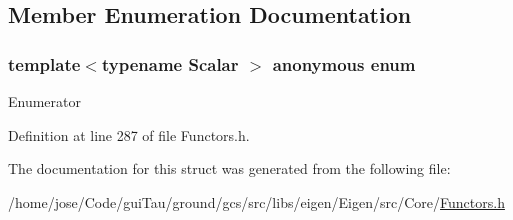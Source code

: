 \subsection{Member Enumeration Documentation}
\hypertarget{structei__functor__traits_3_01ei__scalar__multiple__op_3_01_scalar_01_4_01_4_ada8e544e1769bc2dd640a7e5cf19c49a}{\subsubsection[{anonymous enum}]{\setlength{\rightskip}{0pt plus 5cm}template$<$typename Scalar $>$ anonymous enum}}\label{structei__functor__traits_3_01ei__scalar__multiple__op_3_01_scalar_01_4_01_4_ada8e544e1769bc2dd640a7e5cf19c49a}
\begin{Desc}
\item[Enumerator]\par
\begin{description}
\item[{\em 
\hypertarget{structei__functor__traits_3_01ei__scalar__multiple__op_3_01_scalar_01_4_01_4_ada8e544e1769bc2dd640a7e5cf19c49aa0d8ceb0cb815f002ac2cdf5648f68d2e}{Cost}\label{structei__functor__traits_3_01ei__scalar__multiple__op_3_01_scalar_01_4_01_4_ada8e544e1769bc2dd640a7e5cf19c49aa0d8ceb0cb815f002ac2cdf5648f68d2e}
}]\end{description}
\end{Desc}


Definition at line 287 of file Functors.\-h.



The documentation for this struct was generated from the following file\-:\begin{DoxyCompactItemize}
\item 
/home/jose/\-Code/gui\-Tau/ground/gcs/src/libs/eigen/\-Eigen/src/\-Core/\hyperlink{_core_2_functors_8h}{Functors.\-h}\end{DoxyCompactItemize}
